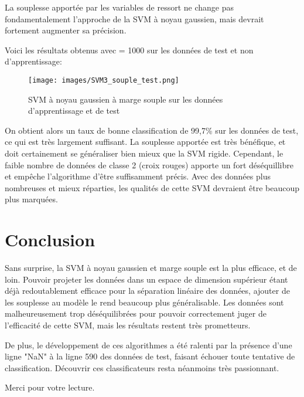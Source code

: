 \documentclass{article}
\begin{document}
La souplesse apportée par les variables de ressort ne change pas fondamentalement l'approche de la SVM à noyau gaussien, mais devrait fortement augmenter sa précision.

Voici les résultats obtenus avec \lambda = 1000 sur les données de test et non d'apprentissage:

\begin{figure}[H]
    \centering
    \texttt{[image: images/SVM3\_souple\_test.png]}
    \caption{SVM à noyau gaussien à marge souple sur les données d'apprentissage et de test}
\end{figure}

On obtient alors un taux de bonne classification de 99,7\% sur les données de test, ce qui est très largement suffisant. La souplesse apportée est très bénéfique, et doit certainement se généraliser bien mieux que la SVM rigide.
Cependant, le faible nombre de données de classe 2 (croix rouges) apporte un fort déséquillibre et empêche l'algorithme d'être suffisamment précis. Avec des données plus nombreuses et mieux réparties, les qualités de cette SVM devraient être beaucoup plus marquées.


\section{Conclusion}

Sans surprise, la SVM à noyau gaussien et marge souple est la plus efficace, et de loin. Pouvoir projeter les données dans un espace de dimension supérieur étant déjà redoutablement efficace pour la séparation linéaire des données, ajouter de les souplesse au modèle le rend beaucoup plus généralisable.
Les données sont malheureusement trop déséquilibrées pour pouvoir correctement juger de l'efficacité de cette SVM, mais les résultats restent très prometteurs.

De plus, le développement de ces algorithmes a été ralenti par la présence d'une ligne "NaN" à la ligne 590 des données de test, faisant échouer toute tentative de classification. Découvrir ces classificateurs resta néanmoins très passionnant.

Merci pour votre lecture.
\end{document}
